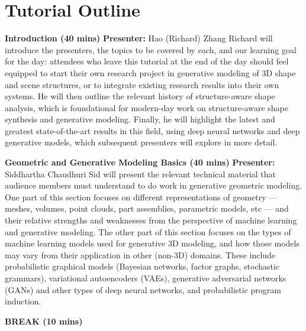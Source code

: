 \documentclass{egpubl}
\begin{document}
\section{Tutorial Outline}

\noindent
\textbf{Introduction (40 mins)}
\newline
\textbf{Presenter:} Hao (Richard) Zhang
\newline
Richard will introduce the presenters, the topics to be covered by each, and our learning goal for the day: attendees who leave this tutorial at the end of the day should feel equipped to start their own research project in generative modeling of 3D shape and scene structures, or to integrate existing research results into their own systems. He will then outline the relevant history of structure-aware shape analysis, which is foundational for modern-day work on structure-aware shape synthesis and generative modeling. Finally, he will highlight the latest and greatest state-of-the-art results in this field, using deep neural networks and deep generative models, which subsequent presenters will explore in more detail.

\noindent
\textbf{Geometric and Generative Modeling Basics (40 mins)}
\newline
\textbf{Presenter:} Siddhartha Chaudhuri
\newline
Sid will present the relevant technical material that audience members must understand to do work in generative geometric modeling.
One part of this section focuses on different representations of geometry --- meshes, volumes, point clouds, part assemblies, parametric models, etc --- and their relative strengths and weaknesses from the perspective of machine learning and generative modeling. The other part of this section focuses on the types of machine learning models used for generative 3D modeling, and how those models may vary from their application in other (non-3D) domains. These include probabilistic graphical models (Bayesian networks, factor graphs, stochastic grammars), variational autoencoders (VAEs), generative adversarial networks (GANs) and other types of deep neural networks, and probabilistic program induction.

\noindent
\textbf{BREAK (10 mins)}
\end{document}
